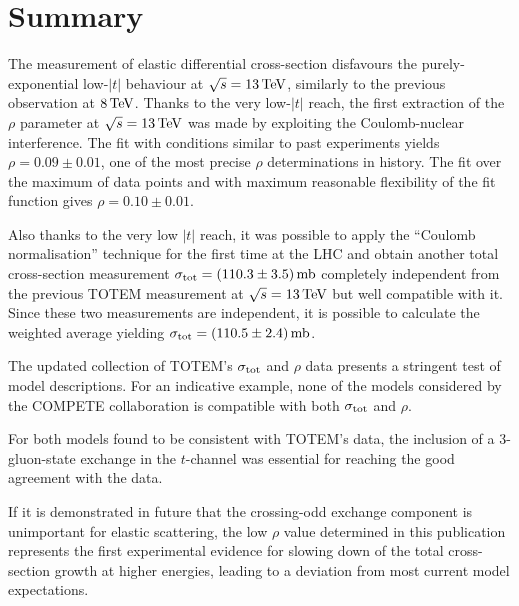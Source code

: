 \section{Summary}
\label{sec:summary}

The measurement of elastic differential cross-section disfavours the purely-exponential low-$|t|$ behaviour at $\sqrt s = 13\,{\rm TeV}$, similarly to the previous observation at $8\,{\rm TeV}$. Thanks to the very low-$|t|$ reach, the first extraction of the $\rho$ parameter at $\sqrt s = 13\,{\rm TeV}$ was made by exploiting the Coulomb-nuclear interference. The fit with conditions similar to past experiments yields $\rho = 0.09 \pm 0.01$, one of the most precise $\rho$ determinations in history. The fit over the maximum of data points and with maximum reasonable flexibility of the fit function gives $\rho = 0.10 \pm 0.01$.

Also thanks to the very low $|t|$ reach, it was possible to apply the ``Coulomb normalisation'' technique for the first time at the LHC and obtain another total cross-section measurement $\sigma_{\rm tot} = (110.3 \pm 3.5)\,{\rm mb}$ completely independent from the previous TOTEM measurement at $\sqrt s = 13\,{\rm TeV}$ \cite{totem-13tev-90m} but well compatible with it. Since these two measurements are independent, it is possible to calculate the weighted average yielding $\sigma_{\rm tot} = (110.5 \pm 2.4)\,{\rm mb}$.

The updated collection of TOTEM's $\sigma_{\rm tot}$ and $\rho$ data presents a stringent test of model descriptions. For an indicative example, none of the models considered by the COMPETE collaboration is compatible with both $\sigma_{\rm tot}$ and $\rho$.

For both models found to be consistent with TOTEM's data, the inclusion of a 3-gluon-state exchange in the $t$-channel was essential for reaching the good agreement with the data.

If it is demonstrated in future that the crossing-odd exchange component is unimportant for elastic scattering, the low $\rho$ value determined in this publication represents the first experimental evidence for slowing down of the total cross-section growth at higher energies, leading to a deviation from most current model expectations.
